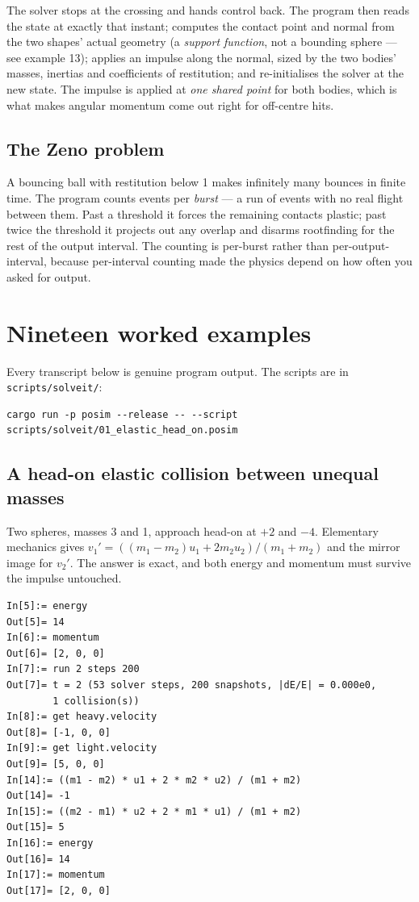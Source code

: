 \documentclass[11pt]{article}
\newcommand{\code}[1]{\texttt{#1}}
\begin{document}
The solver stops at the crossing and hands control back. The program
then reads the state at exactly that instant; computes the contact point
and normal from the two shapes' actual geometry (a \emph{support
function}, not a bounding sphere --- see example 13); applies an impulse
along the normal, sized by the two bodies' masses, inertias and
coefficients of restitution; and re-initialises the solver at the new
state. The impulse is applied at \emph{one shared point} for both
bodies, which is what makes angular momentum come out right for
off-centre hits.

\subsection{The Zeno problem}

A bouncing ball with restitution below 1 makes infinitely many bounces
in finite time. The program counts events per \emph{burst} --- a run of
events with no real flight between them. Past a threshold it forces the
remaining contacts plastic; past twice the threshold it projects out any
overlap and disarms rootfinding for the rest of the output interval. The
counting is per-burst rather than per-output-interval, because
per-interval counting made the physics depend on how often you asked for
output.

\section{Nineteen worked examples}\label{sec:examples}

Every transcript below is genuine program output. The scripts are in
\code{scripts/solveit/}:

\begin{lstlisting}
cargo run -p posim --release -- --script scripts/solveit/01_elastic_head_on.posim
\end{lstlisting}

\subsection{A head-on elastic collision between unequal masses}

Two spheres, masses 3 and 1, approach head-on at $+2$ and $-4$.
Elementary mechanics gives
$v_1' = ((m_1-m_2)u_1 + 2m_2u_2)/(m_1+m_2)$ and the mirror image for
$v_2'$. The answer is exact, and both energy and momentum must survive
the impulse untouched.

\begin{lstlisting}
In[5]:= energy
Out[5]= 14
In[6]:= momentum
Out[6]= [2, 0, 0]
In[7]:= run 2 steps 200
Out[7]= t = 2 (53 solver steps, 200 snapshots, |dE/E| = 0.000e0,
        1 collision(s))
In[8]:= get heavy.velocity
Out[8]= [-1, 0, 0]
In[9]:= get light.velocity
Out[9]= [5, 0, 0]
In[14]:= ((m1 - m2) * u1 + 2 * m2 * u2) / (m1 + m2)
Out[14]= -1
In[15]:= ((m2 - m1) * u2 + 2 * m1 * u1) / (m1 + m2)
Out[15]= 5
In[16]:= energy
Out[16]= 14
In[17]:= momentum
Out[17]= [2, 0, 0]
\end{lstlisting}
\end{document}
